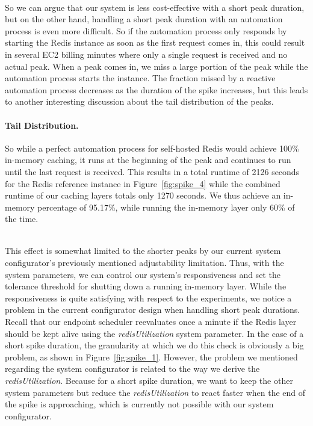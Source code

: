 ~\\
So we can argue that our system is less cost-effective with a short peak duration, but on the other hand, handling a short peak duration with an automation process is even more difficult. So if the automation process only responds by starting the Redis instance as soon as the first request comes in, this could result in several EC2 billing minutes where only a single request is received and no actual peak. When a peak comes in, we miss a large portion of the peak while the automation process starts the instance. The fraction missed by a reactive automation process decreases as the duration of the spike increases, but this leads to another interesting discussion about the tail distribution of the peaks. 

\paragraph{Tail Distribution.}
So while a perfect automation process for self-hosted Redis would achieve 100\% in-memory caching, it runs at the beginning of the peak and continues to run until the last request is received. This results in a total runtime of 2126 seconds for the Redis reference instance in Figure~\ref{fig:spike_4} while the combined runtime of our caching layers totals only 1270 seconds. We thus achieve an in-memory percentage of 95.17\%, while running the in-memory layer only 60\% of the time. 

~\\
This effect is somewhat limited to the shorter peaks by our current system configurator's previously mentioned adjustability limitation. Thus, with the system parameters, we can control our system's responsiveness and set the tolerance threshold for shutting down a running in-memory layer. While the responsiveness is quite satisfying with respect to the experiments, we notice a problem in the current configurator design when handling short peak durations. Recall that our endpoint scheduler reevaluates once a minute if the Redis layer should be kept alive using the \emph{redisUtilization} system parameter. In the case of a short spike duration, the granularity at which we do this check is obviously a big problem, as shown in Figure~\ref{fig:spike_1}. However, the problem we mentioned regarding the system configurator is related to the way we derive the \emph{redisUtilization}. Because for a short spike duration, we want to keep the other system parameters but reduce the \emph{redisUtilization} to react faster when the end of the spike is approaching, which is currently not possible with our system configurator.

